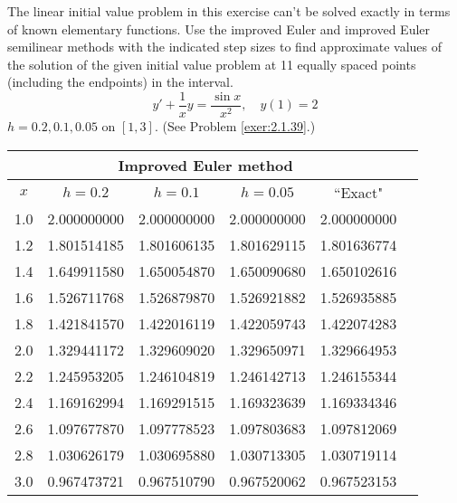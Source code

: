 \documentclass{ximera}
\begin{document}
\begin{problem}\label{exer:3.2.16} The linear initial value problem in this exercise can't be solved exactly in terms of known elementary functions. Use the improved Euler and improved Euler semilinear methods with the indicated step sizes to find approximate values of the solution of the given initial value problem at 11 equally spaced points (including the endpoints) in the interval.
$$y'+\frac{1}{x}y=\frac{\sin x}{x^2},\quad y(1)=2$$
$h=0.2,0.1,0.05$ on $[1,3]$. (See Problem \ref{exer:2.1.39}.)

\begin{solution}
    {\small
\begin{tabular}{|c|r|r|r|r|r|}
\hline
\multicolumn{5}{|c|}{Improved Euler method}\\\hline
\multicolumn{1}{|c|}{$x$}&
\multicolumn{1}{|c|}{$h=0.2$}&
\multicolumn{1}{|c|}{$h=0.1$}&
\multicolumn{1}{|c|}{$h=0.05$}&
\multicolumn{1}{|c|}{``Exact"}\\ \hline
1.0 & 2.000000000 & 2.000000000 & 2.000000000 & 2.000000000 \\
1.2 & 1.801514185 & 1.801606135 & 1.801629115 & 1.801636774 \\
1.4 & 1.649911580 & 1.650054870 & 1.650090680 & 1.650102616 \\
1.6 & 1.526711768 & 1.526879870 & 1.526921882 & 1.526935885 \\
1.8 & 1.421841570 & 1.422016119 & 1.422059743 & 1.422074283 \\
2.0 & 1.329441172 & 1.329609020 & 1.329650971 & 1.329664953 \\
2.2 & 1.245953205 & 1.246104819 & 1.246142713 & 1.246155344 \\
2.4 & 1.169162994 & 1.169291515 & 1.169323639 & 1.169334346 \\
2.6 & 1.097677870 & 1.097778523 & 1.097803683 & 1.097812069 \\
2.8 & 1.030626179 & 1.030695880 & 1.030713305 & 1.030719114 \\
3.0 & 0.967473721 & 0.967510790 & 0.967520062 & 0.967523153 \\
\hline
\end{tabular}}


\end{solution}
\end{problem}
\end{document}
